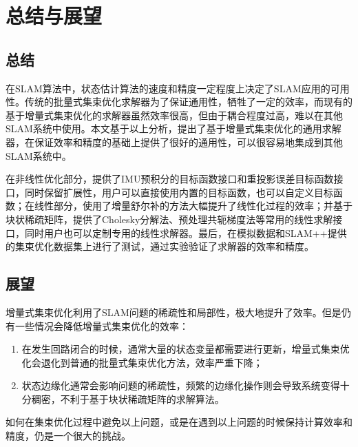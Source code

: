 \chapter{总结与展望}\label{ch:con}

\section{总结}

在SLAM算法中，状态估计算法的速度和精度一定程度上决定了SLAM应用的可用性。传统的批量式集束优化求解器为了保证通用性，牺牲了一定的效率，而现有的基于增量式集束优化的求解器虽然效率很高，但由于耦合程度过高，难以在其他SLAM系统中使用。本文基于以上分析，提出了基于增量式集束优化的通用求解器，在保证效率和精度的基础上提供了很好的通用性，可以很容易地集成到其他SLAM系统中。

在非线性优化部分，提供了IMU预积分的目标函数接口和重投影误差目标函数接口，同时保留扩展性，用户可以直接使用内置的目标函数，也可以自定义目标函数；在线性部分，使用了增量舒尔补的方法大幅提升了线性化过程的效率；并基于块状稀疏矩阵，提供了Cholesky分解法、预处理共轭梯度法等常用的线性求解接口，同时用户也可以定制专用的线性求解器。最后，在模拟数据和SLAM++提供的集束优化数据集上进行了测试，通过实验验证了求解器的效率和精度。

\section{展望}

增量式集束优化利用了SLAM问题的稀疏性和局部性，极大地提升了效率。但是仍有一些情况会降低增量式集束优化的效率：
\begin{enumerate}
    \item 在发生回路闭合的时候，通常大量的状态变量都需要进行更新，增量式集束优化会退化到普通的批量式集束优化方法，效率严重下降；
    \item 状态边缘化通常会影响问题的稀疏性，频繁的边缘化操作则会导致系统变得十分稠密，不利于基于块状稀疏矩阵的求解算法。
\end{enumerate}
如何在集束优化过程中避免以上问题，或是在遇到以上问题的时候保持计算效率和精度，仍是一个很大的挑战。

